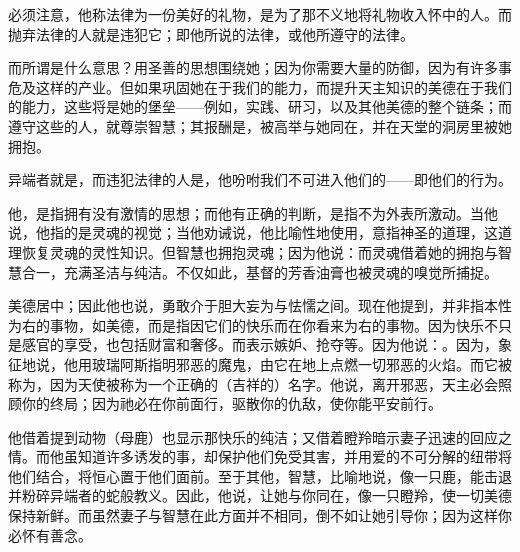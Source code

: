 必须注意，他称法律为一份美好的礼物，是为了那不义地将礼物收入怀中的人。而抛弃法律的人就是违犯它；即他所说的法律，或他所遵守的法律。\newline{}\par

而所谓是什么意思？用圣善的思想围绕她；因为你需要大量的防御，因为有许多事危及这样的产业。但如果巩固她在于我们的能力，而提升天主知识的美德在于我们的能力，这些将是她的堡垒——例如，实践、研习，以及其他美德的整个链条；而遵守这些的人，就尊崇智慧；其报酬是，被高举与她同在，并在天堂的洞房里被她拥抱。\newline{}\par

异端者就是，而违犯法律的人是，他吩咐我们不可进入他们的——即他们的行为。\newline{}\par

他，是指拥有没有激情的思想；而他有正确的判断，是指不为外表所激动。当他说，他指的是灵魂的视觉；当他劝诫说，他比喻性地使用，意指神圣的道理，这道理恢复灵魂的灵性知识。但智慧也拥抱灵魂；因为他说：而灵魂借着她的拥抱与智慧合一，充满圣洁与纯洁。不仅如此，基督的芳香油膏也被灵魂的嗅觉所捕捉。\newline{}\par

美德居中；因此他也说，勇敢介于胆大妄为与怯懦之间。现在他提到，并非指本性为右的事物，如美德，而是指因它们的快乐而在你看来为右的事物。因为快乐不只是感官的享受，也包括财富和奢侈。而表示嫉妒、抢夺等。因为他说：。因为，象征地说，他用玻瑞阿斯指明邪恶的魔鬼，由它在地上点燃一切邪恶的火焰。而它被称为，因为天使被称为一个正确的（吉祥的）名字。他说，离开邪恶，天主必会照顾你的终局；因为祂必在你前面行，驱散你的仇敌，使你能平安前行。\newline{}\par

他借着提到动物（母鹿）也显示那快乐的纯洁；又借着瞪羚暗示妻子迅速的回应之情。而他虽知道许多诱发的事，却保护他们免受其害，并用爱的不可分解的纽带将他们结合，将恒心置于他们面前。至于其他，智慧，比喻地说，像一只鹿，能击退并粉碎异端者的蛇般教义。因此，他说，让她与你同在，像一只瞪羚，使一切美德保持新鲜。而虽然妻子与智慧在此方面并不相同，倒不如让她引导你；因为这样你必怀有善念。\newline{}\par

